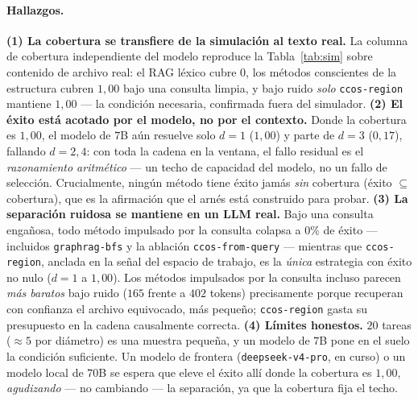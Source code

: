 \documentclass[11pt]{article}
\newcommand{\code}[1]{\texttt{#1}}
\begin{document}
\paragraph{Hallazgos.}
\textbf{(1) La cobertura se transfiere de la simulación al texto real.} La columna de
cobertura independiente del modelo reproduce la Tabla~\ref{tab:sim} sobre contenido de
archivo real: el RAG léxico cubre $0$, los métodos conscientes de la estructura cubren
$1{,}00$ bajo una consulta limpia, y bajo ruido \emph{solo} \code{ccos-region} mantiene
$1{,}00$ --- la condición necesaria, confirmada fuera del simulador.
\textbf{(2) El éxito está acotado por el modelo, no por el contexto.} Donde la cobertura
es $1{,}00$, el modelo de $7$B aún resuelve solo $d{=}1$ ($1{,}00$) y parte de $d{=}3$
($0{,}17$), fallando $d{=}2,4$: con toda la cadena en la ventana, el fallo residual es
el \emph{razonamiento aritmético} --- un techo de capacidad del modelo, no un fallo de
selección. Crucialmente, ningún método tiene éxito jamás \emph{sin} cobertura (éxito
$\subseteq$ cobertura), que es la afirmación que el arnés está construido para probar.
\textbf{(3) La separación ruidosa se mantiene en un LLM real.} Bajo una consulta
engañosa, todo método impulsado por la consulta colapsa a $0\%$ de éxito --- incluidos
\code{graphrag-bfs} y la ablación \code{ccos-from-query} --- mientras que
\code{ccos-region}, anclada en la señal del espacio de trabajo, es la \emph{única}
estrategia con éxito no nulo ($d{=}1$ a $1{,}00$). Los métodos impulsados por la
consulta incluso parecen \emph{más baratos} bajo ruido ($165$ frente a $402$ tokens)
precisamente porque recuperan con confianza el archivo equivocado, más pequeño;
\code{ccos-region} gasta su presupuesto en la cadena causalmente correcta.
\textbf{(4) Límites honestos.} $20$ tareas ($\approx 5$ por diámetro) es una muestra
pequeña, y un modelo de $7$B pone en el suelo la condición suficiente. Un modelo de
frontera (\code{deepseek-v4-pro}, en curso) o un modelo local de $70$B se espera que
eleve el éxito allí donde la cobertura es $1{,}00$, \emph{agudizando} --- no cambiando
--- la separación, ya que la cobertura fija el techo.
\end{document}
